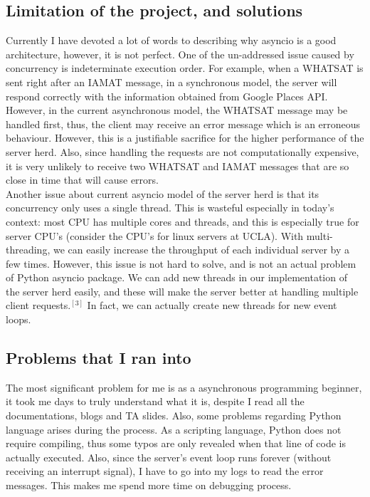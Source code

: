 \documentclass[letterpaper,twocolumn,10pt]{article}
\begin{document}
\subsection{Limitation of the project, and solutions}
Currently I have devoted a lot of words to describing why asyncio is a good architecture, however, it is not perfect. One of the un-addressed issue caused by concurrency is indeterminate execution order. For example, when a WHATSAT is sent right after an IAMAT message, in a synchronous model, the server will respond correctly with the information obtained from Google Places API. However, in the current asynchronous model, the WHATSAT message may be handled first, thus, the client may receive an error message which is an erroneous behaviour. However, this is a justifiable sacrifice for the higher performance of the server herd. Also, since handling the requests are not computationally expensive, it is very unlikely to receive two WHATSAT and IAMAT messages that are so close in time that will cause errors. \\

Another issue about current asyncio model of the server herd is that its concurrency only uses a single thread. This is wasteful especially in today's context: most CPU has multiple cores and threads, and this is especially true for server CPU's (consider the CPU's for linux servers at UCLA). With multi-threading, we can easily increase the throughput of each individual server by a few times. However, this issue is not hard to solve, and is not an actual problem of Python asyncio package. We can add new threads in our implementation of the server herd easily, and these will make the server better at handling multiple client requests.$^{[3]}$ In fact, we can actually create new threads for new event loops.

\subsection{Problems that I ran into}
The most significant problem for me is as a asynchronous programming beginner, it took me days to truly understand what it is, despite I read all the documentations, blogs and TA slides. Also, some problems regarding Python language arises during the process. As a scripting language, Python does not require compiling, thus some typos are only revealed when that line of code is actually executed. Also, since the server's event loop runs forever (without receiving an interrupt signal), I have to go into my logs to read the error messages. This makes me spend more time on debugging process.
\end{document}
